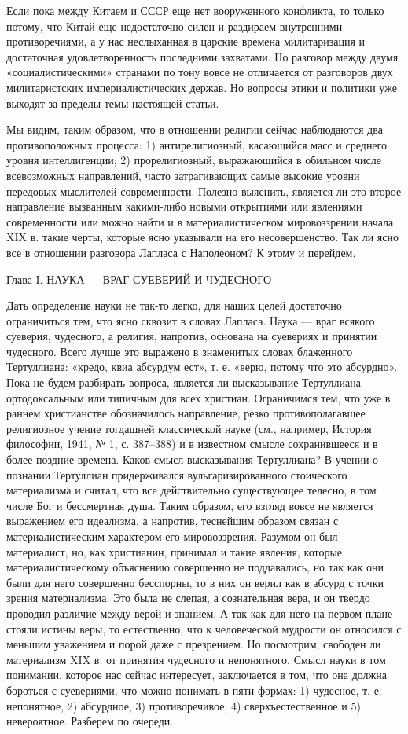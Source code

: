 Если пока между Китаем и СССР еще нет вооруженного конфликта, то только потому,
что Китай еще недостаточно силен и раздираем внутренними противоречиями, а у
нас неслыханная в царские времена милитаризация и достаточная удовлетворенность
последними захватами. Но разговор между двумя «социалистическими» странами по
тону вовсе не отличается от разговоров двух милитаристских империалистических
держав. Но вопросы этики и политики уже выходят за пределы темы настоящей
статьи.

Мы видим, таким образом, что в отношении религии сейчас наблюдаются два
противоположных процесса: 1) антирелигиозный, касающийся масс и среднего уровня
интеллигенции; 2) прорелигиозный, выражающийся в обильном числе всевозможных
направлений, часто затрагивающих самые высокие уровни передовых мыслителей
современности. Полезно выяснить, является ли это второе направление вызванным
какими-либо новыми открытиями или явлениями современности или можно найти и в
материалистическом мировоззрении начала XIX в. такие черты, которые ясно
указывали на его несовершенство. Так ли ясно все в отношении разговора Лапласа
с Наполеоном? К этому и перейдем.

Глава I. НАУКА --- ВРАГ СУЕВЕРИЙ И ЧУДЕСНОГО

Дать определение науки не так-то легко, для наших целей достаточно ограничиться
тем, что ясно сквозит в словах Лапласа. Наука --- враг всякого суеверия,
чудесного, а религия, напротив, основана на суевериях и принятии чудесного.
Всего лучше это выражено в знаменитых словах блаженного Тертуллиана: «кредо,
квиа абсурдум ест», т. е. «верю, потому что это абсурдно». Пока не будем
разбирать вопроса, является ли высказывание Тертуллиана ортодоксальным или
типичным для всех христиан. Ограничимся тем, что уже в раннем христианстве
обозначилось направление, резко противополагавшее религиозное учение тогдашней
классической науке (см., например, История философии, 1941, № 1, с. 387--388) и
в известном смысле сохранившееся и в более поздние времена. Каков смысл
высказывания Тертуллиана? В учении о познании Тертуллиан придерживался
вульгаризированного стоического материализма и считал, что все действительно
существующее телесно, в том числе Бог и бессмертная душа. Таким образом, его
взгляд вовсе не является выражением его идеализма, а напротив, теснейшим
образом связан с материалистическим характером его мировоззрения. Разумом он
был материалист, но, как христианин, принимал и такие явления, которые
материалистическому объяснению
совершенно не поддавались, но так как они были для него совершенно бесспорны,
то в них он верил как в абсурд с точки зрения материализма. Это была не слепая,
а сознательная вера, и он твердо проводил различие между верой и знанием. А так
как для него на первом плане стояли истины веры, то естественно, что к
человеческой мудрости он относился с меньшим уважением и порой даже с
презрением. Но посмотрим, свободен ли материализм XIX в. от принятия чудесного
и непонятного. Смысл науки в том понимании, которое нас сейчас интересует,
заключается в том, что она должна бороться с суевериями, что можно понимать в
пяти формах: 1) чудесное, т. е. непонятное, 2) абсурдное, 3) противоречивое, 4)
сверхъестественное и 5) невероятное. Разберем по очереди.

